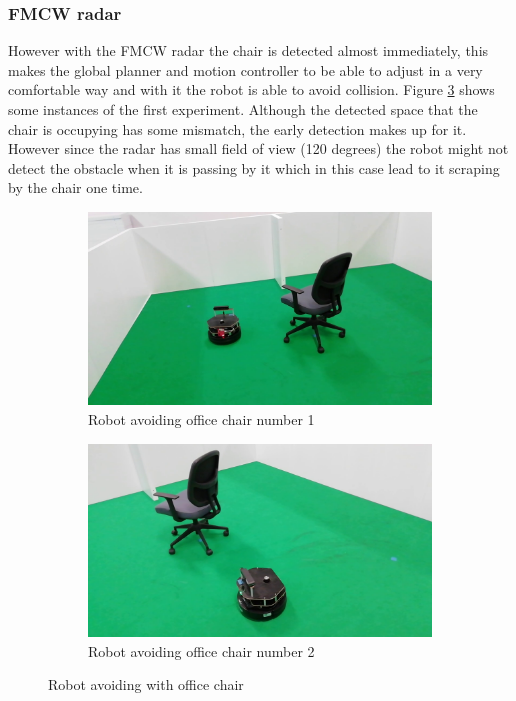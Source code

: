 \subsubsection*{\ac{FMCW} \ac{radar}}
However with the \ac{FMCW} radar the chair is detected almost immediately, this makes the global planner and motion controller to be able to adjust in a very comfortable way and with it the robot is able to avoid collision. Figure \ref{fig:wchairRS} shows some instances of the first experiment. Although the detected space that the chair is occupying has some mismatch, the early detection makes up for it. However since the radar has small field of view (120 degrees) the robot might not detect the obstacle when it is passing by it which in this case lead to it scraping by the chair one time.

\begin{figure}[h!]
  \centering
  \begin{subfigure}[b]{0.49\linewidth}
    \includegraphics[width=\linewidth]{imgs/chapter5/wchairRS.png}
     \caption{Robot avoiding office chair number 1}
     \label{fig::wchair}
  \end{subfigure}
  \begin{subfigure}[b]{0.49\linewidth}
    \includegraphics[width=\linewidth]{imgs/chapter5/wchairRS2.png}
    \caption{Robot avoiding office chair number 2}
    \label{fig::nchair}
  \end{subfigure}
  \caption{Robot avoiding with office chair}
  \label{fig:wchairRS}
\end{figure}

